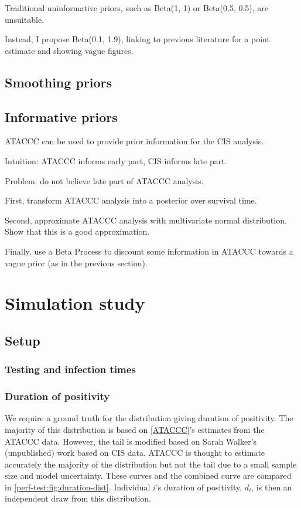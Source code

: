 \documentclass[main.tex]{subfiles}
\begin{document}
Traditional uninformative priors, such as Beta(1, 1) or Beta(0.5, 0.5), are unsuitable.

Instead, I propose Beta(0.1, 1.9), linking to previous literature for a point estimate and showing vague figures.

\subsection{Smoothing priors}

\subsection{Informative priors}

ATACCC can be used to provide prior information for the CIS analysis.

Intuition: ATACCC informs early part, CIS informs late part.

Problem: do not believe late part of ATACCC analysis.

First, transform ATACCC analysis into a posterior over survival time.

Second, approximate ATACCC analysis with multivariate normal distribution.
Show that this is a good approximation.

Finally, use a Beta Process to discount some information in ATACCC towards a vague prior (as in the previous section).

\section{Simulation study} \label{perf-test:sec:simulation-study}

\subsection{Setup}

\subsubsection{Testing and infection times}

\subsubsection{Duration of positivity}

We require a ground truth for the distribution giving duration of positivity.
The majority of this distribution is based on \autoref{ATACCC}'s estimates from the ATACCC data.
However, the tail is modified based on Sarah Walker's (unpublished) work based on CIS data.
ATACCC is thought to estimate accurately the majority of the distribution but not the tail due to a small sample size and model uncertainty.
These curves and the combined curve are compared in \autoref{perf-test:fig:duration-dist}.
Individual $i$'s duration of positivity, $d_i$, is then an independent draw from this distribution.
\end{document}
